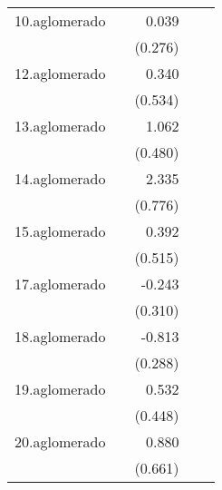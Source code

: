 {\begin{longtable}{l*{4}{D{.}{.}{-1}}}
\addlinespace
10.aglomerado&                     &       0.039         &                     &                     \\
            &                     &     (0.276)         &                     &                     \\
\addlinespace
12.aglomerado&                     &       0.340         &                     &                     \\
            &                     &     (0.534)         &                     &                     \\
\addlinespace
13.aglomerado&                     &       1.062\sym{*}  &                     &                     \\
            &                     &     (0.480)         &                     &                     \\
\addlinespace
14.aglomerado&                     &       2.335\sym{**} &                     &                     \\
            &                     &     (0.776)         &                     &                     \\
\addlinespace
15.aglomerado&                     &       0.392         &                     &                     \\
            &                     &     (0.515)         &                     &                     \\
\addlinespace
17.aglomerado&                     &      -0.243         &                     &                     \\
            &                     &     (0.310)         &                     &                     \\
\addlinespace
18.aglomerado&                     &      -0.813\sym{**} &                     &                     \\
            &                     &     (0.288)         &                     &                     \\
\addlinespace
19.aglomerado&                     &       0.532         &                     &                     \\
            &                     &     (0.448)         &                     &                     \\
\addlinespace
20.aglomerado&                     &       0.880         &                     &                     \\
            &                     &     (0.661)         &                     &                     \\

\end{longtable}}
